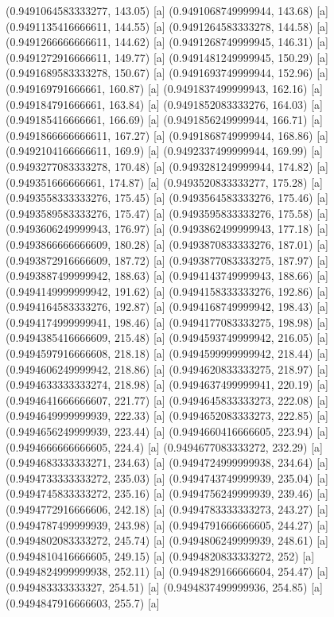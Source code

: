 {{{(0.9491064583333277, 143.05) [a] 
(0.9491068749999944, 143.68) [a] 
(0.9491135416666611, 144.55) [a] 
(0.9491264583333278, 144.58) [a] 
(0.9491266666666611, 144.62) [a] 
(0.9491268749999945, 146.31) [a] 
(0.9491272916666611, 149.77) [a] 
(0.9491481249999945, 150.29) [a] 
(0.9491689583333278, 150.67) [a] 
(0.9491693749999944, 152.96) [a] 
(0.949169791666661, 160.87) [a] 
(0.9491837499999943, 162.16) [a] 
(0.949184791666661, 163.84) [a] 
(0.9491852083333276, 164.03) [a] 
(0.949185416666661, 166.69) [a] 
(0.9491856249999944, 166.71) [a] 
(0.9491866666666611, 167.27) [a] 
(0.9491868749999944, 168.86) [a] 
(0.9492104166666611, 169.9) [a] 
(0.9492337499999944, 169.99) [a] 
(0.9493277083333278, 170.48) [a] 
(0.9493281249999944, 174.82) [a] 
(0.949351666666661, 174.87) [a] 
(0.9493520833333277, 175.28) [a] 
(0.9493558333333276, 175.45) [a] 
(0.9493564583333276, 175.46) [a] 
(0.9493589583333276, 175.47) [a] 
(0.9493595833333276, 175.58) [a] 
(0.9493606249999943, 176.97) [a] 
(0.9493862499999943, 177.18) [a] 
(0.9493866666666609, 180.28) [a] 
(0.9493870833333276, 187.01) [a] 
(0.9493872916666609, 187.72) [a] 
(0.9493877083333275, 187.97) [a] 
(0.9493887499999942, 188.63) [a] 
(0.9494143749999943, 188.66) [a] 
(0.9494149999999942, 191.62) [a] 
(0.9494158333333276, 192.86) [a] 
(0.9494164583333276, 192.87) [a] 
(0.9494168749999942, 198.43) [a] 
(0.9494174999999941, 198.46) [a] 
(0.9494177083333275, 198.98) [a] 
(0.9494385416666609, 215.48) [a] 
(0.9494593749999942, 216.05) [a] 
(0.9494597916666608, 218.18) [a] 
(0.9494599999999942, 218.44) [a] 
(0.9494606249999942, 218.86) [a] 
(0.9494620833333275, 218.97) [a] 
(0.9494633333333274, 218.98) [a] 
(0.9494637499999941, 220.19) [a] 
(0.9494641666666607, 221.77) [a] 
(0.9494645833333273, 222.08) [a] 
(0.9494649999999939, 222.33) [a] 
(0.9494652083333273, 222.85) [a] 
(0.9494656249999939, 223.44) [a] 
(0.9494660416666605, 223.94) [a] 
(0.9494666666666605, 224.4) [a] 
(0.9494677083333272, 232.29) [a] 
(0.9494683333333271, 234.63) [a] 
(0.9494724999999938, 234.64) [a] 
(0.9494733333333272, 235.03) [a] 
(0.9494743749999939, 235.04) [a] 
(0.9494745833333272, 235.16) [a] 
(0.9494756249999939, 239.46) [a] 
(0.9494772916666606, 242.18) [a] 
(0.9494783333333273, 243.27) [a] 
(0.9494787499999939, 243.98) [a] 
(0.9494791666666605, 244.27) [a] 
(0.9494802083333272, 245.74) [a] 
(0.9494806249999939, 248.61) [a] 
(0.9494810416666605, 249.15) [a] 
(0.9494820833333272, 252) [a] 
(0.9494824999999938, 252.11) [a] 
(0.9494829166666604, 254.47) [a] 
(0.949483333333327, 254.51) [a] 
(0.9494837499999936, 254.85) [a] 
(0.9494847916666603, 255.7) [a] 
}}}
